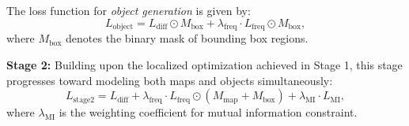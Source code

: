 The loss function for \textit{object generation}  is given by:
\begin{equation}
	L_{\text{object}} = L_{\text{diff}} \odot M_{\text{box}} + \lambda_{\text{freq}} \cdot L_{\text{freq}} \odot M_{\text{box}},
\end{equation}
where $M_{\text{box}}$ denotes the binary mask of bounding box regions.

\textbf{Stage 2:}
Building upon the localized optimization achieved in Stage 1, this stage progresses toward modeling both maps and objects simultaneously:
\begin{equation}
	L_{\text{stage2}} = L_{\text{diff}} + \lambda_{\text{freq}} \cdot L_{\text{freq}} \odot (M_{\text{map}} + M_{\text{box}}) + \lambda_{\text{MI}} \cdot L_{\text{MI}},
\end{equation}
where $\lambda_{\text{MI}}$ is the weighting coefficient for mutual information constraint.